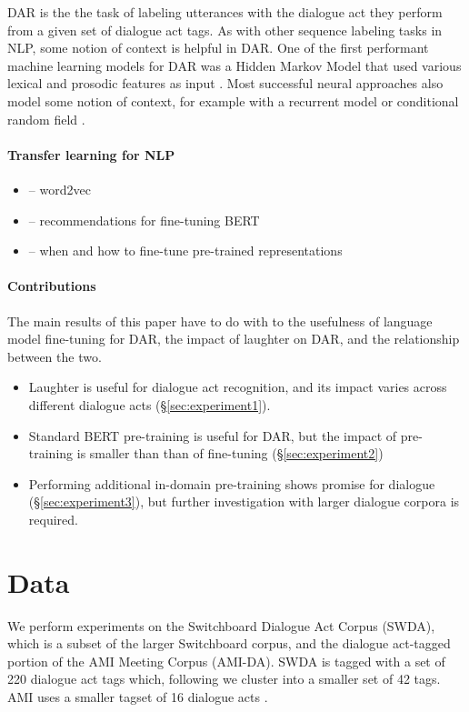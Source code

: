 \documentclass[11pt,a4paper]{article}
\begin{document}
DAR is the the task of labeling utterances with the dialogue act they perform 
from a given set of dialogue act tags.
As with other sequence labeling tasks in NLP, some notion of context is helpful in DAR.
One of the first performant machine learning models for DAR was a Hidden Markov Model that used various lexical and prosodic features as input \citep{stolckeDialogueActModeling2000}.
Most successful neural approaches also model some notion of context, 
for example with a recurrent model \citep[e.g.,][]{botheContextbasedApproachDialogue2018} or conditional random field \citep[e.g.,][]{chenDialogueActRecognition2017}.

\paragraph{Transfer learning for NLP}
\begin{itemize}
  \item \citet{mikolovDistributedRepresentationsWords2013} -- word2vec
  \item \citet{sunHowFineTuneBERT2019} -- recommendations for fine-tuning BERT
  \item \citet{petersTuneNotTune2019} -- when and how to fine-tune pre-trained representations
\end{itemize}


\paragraph{Contributions}
The main results of this paper have to do with to the usefulness of language model fine-tuning for DAR, the impact of laughter on DAR, and the relationship between the two.
\begin{itemize}
  \item Laughter is useful for dialogue act recognition, and its impact varies across different dialogue acts (\S\ref{sec:experiment1}).
  \item Standard BERT pre-training is useful for DAR, but the impact of pre-training is smaller than than of fine-tuning (\S\ref{sec:experiment2})
  \item Performing additional in-domain pre-training shows promise for dialogue (\S\ref{sec:experiment3}), but further investigation with larger dialogue corpora is required.
\end{itemize}


\section{Data}
We perform experiments on the Switchboard Dialogue Act Corpus (SWDA), which is a subset of the larger Switchboard corpus, and the dialogue act-tagged portion of the AMI Meeting Corpus (AMI-DA). 
SWDA is tagged with a set of 220 dialogue act tags which, following  \citet{jurafskySwitchboardSWBDDAMSLShallowDiscourseFunction1997a} we cluster into a smaller set of 42 tags.
AMI uses a smaller tagset of 16 dialogue acts \citep{GuidelinesDialogueAct2005}.
\end{document}

